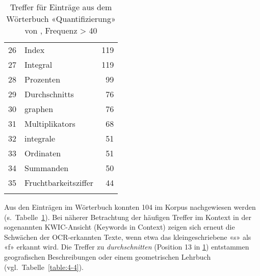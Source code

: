 \begin{longtable}{llr}
        26 & Index & 119 \\ 
        27 & Integral & 119 \\ 
        28 & Prozenten & 99 \\ 
        29 & Durchschnitts & 76 \\ 
        30 & graphen & 76 \\ 
        31 & Multiplikators & 68 \\ 
        32 & integrale & 51 \\ 
        33 & Ordinaten & 51 \\ 
        34 & Summanden & 50 \\ 
        35 & Fruchtbarkeitsziffer & 44 \\ 
        \bottomrule
    \caption{Treffer für Einträge aus dem Wörterbuch «Quantifizierung» von \cite{buchner_zur_2020}, Frequenz > 40}
    \label{table:4-3}
\end{longtable}

Aus den  Einträgen im Wörterbuch konnten 104 im Korpus nachgewiesen werden (s.~Tabelle~\ref{table:4-3}). Bei näherer Betrachtung der häufigen Treffer im Kontext in der sogenannten KWIC-Ansicht (Keywords in Context) zeigen sich erneut die Schwächen der OCR-erkannten Texte, wenn etwa das kleingeschriebene «s» als «f» erkannt wird. Die Treffer zu \textit{durchschnitten} (Position 13 in \cref{table:4-3}) entstammen geografischen Beschreibungen oder einem geometrischen Lehrbuch (vgl.~Tabelle~\ref{table:4-4}).

\hspace{2cm}

